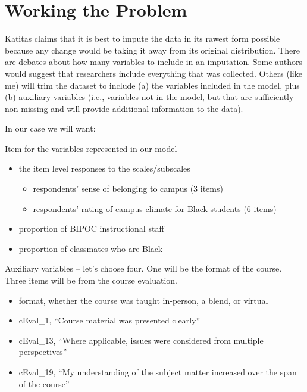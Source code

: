 \documentclass[
  11pt,
]{book}
\providecommand{\tightlist}{%
  \setlength{\itemsep}{0pt}\setlength{\parskip}{0pt}}
\begin{document}
\hypertarget{working-the-problem-2}{%
\section{Working the Problem}\label{working-the-problem-2}}

Katitas \citeyearpar{katitas_getting_2019} claims that it is best to impute the data in its rawest form possible because any change would be taking it away from its original distribution. There are debates about how many variables to include in an imputation. Some authors would suggest that researchers include everything that was collected. Others (like me) will trim the dataset to include (a) the variables included in the model, plus (b) auxiliary variables (i.e., variables not in the model, but that are sufficiently non-missing and will provide additional information to the data).

In our case we will want:

Item for the variables represented in our model

\begin{itemize}
\tightlist
\item
  the item level responses to the scales/subscales

  \begin{itemize}
  \tightlist
  \item
    respondents' sense of belonging to campus (3 items)
  \item
    respondents' rating of campus climate for Black students (6 items)
  \end{itemize}
\item
  proportion of BIPOC instructional staff
\item
  proportion of classmates who are Black
\end{itemize}

Auxiliary variables -- let's choose four. One will be the format of the course. Three items will be from the course evaluation.

\begin{itemize}
\tightlist
\item
  format, whether the course was taught in-person, a blend, or virtual
\item
  cEval\_1, ``Course material was presented clearly''
\item
  cEval\_13, ``Where applicable, issues were considered from multiple perspectives''
\item
  cEval\_19, ``My understanding of the subject matter increased over the span of the course''
\end{itemize}
\end{document}

